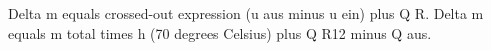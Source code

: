 Delta m equals crossed-out expression (u aus minus u ein) plus Q R.  
Delta m equals m total times h (70 degrees Celsius) plus Q R12 minus Q aus.